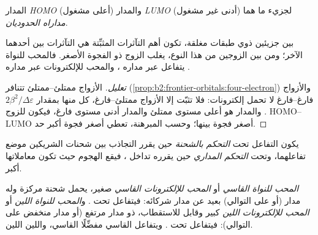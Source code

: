 \begin{definition}\label{def:b2:frontier-orbitals:frontier}
المدار \emph{HOMO} (أعلى  مشغول) والمدار
\emph{LUMO} (أدنى  غير مشغول) لجزيء ما هما
\emph{مداراه الحدوديان}.
\end{definition}

\begin{proposition}\label{prop:b2:frontier-orbitals:dominant}
بين جزيئين ذوي طبقات مغلقة، تكون أهم التآثرات المثبِّتة
هي التآثرات بين  أحدهما  الآخر؛ ومن بين الزوجين من هذا النوع، يغلب الزوج
ذو الفجوة الأصغر. فالمحب للنواة يتفاعل عبر مداره ، 
والمحب للإلكترونات عبر مداره .
\end{proposition}

\begin{proof}[تعليل]
الأزواج ممتلئ--ممتلئ تتنافر (\cref{prop:b2:frontier-orbitals:four-electron}) والأزواج فارغ--فارغ
لا تحمل إلكترونات: فلا تثبّت إلا الأزواج ممتلئ--فارغ، كل منها بمقدار $2\beta^2/\Delta\varepsilon$.
والمدار  هو أعلى مستوى ممتلئ والمدار  أدنى مستوى فارغ، فيكون للزوج
HOMO--LUMO أصغر فجوة بينها؛ وحسب المبرهنة، تعطي أصغر فجوة
أكبر حد.
\end{proof}

\begin{definition}\label{def:b2:frontier-orbitals:control}
يكون التفاعل تحت \emph{التحكم بالشحنة} حين يقرر التجاذب
بين شحنات الشريكين موضع تفاعلهما، وتحت
\emph{التحكم المداري} حين يقرره تداخل ،
فيقع الهجوم حيث تكون معاملاتها أكبر.
\end{definition}

\begin{definition}\label{def:b2:frontier-orbitals:hard-soft}
\emph{المحب للنواة القاسي} أو \emph{المحب للإلكترونات القاسي}
 صغير، يحمل شحنة مركزة وله
مدار  (أو  على التوالي) بعيد عن مدار شركائه: فيتفاعل تحت . و\emph{المحب للنواة اللين} أو \emph{المحب للإلكترونات اللين}
 كبير وقابل للاستقطاب، ذو مدار  مرتفع
(أو مدار  منخفض على التوالي): فيتفاعل تحت . ويتفاعل القاسي مفضِّلًا
القاسي، واللين اللين.
\end{definition}

